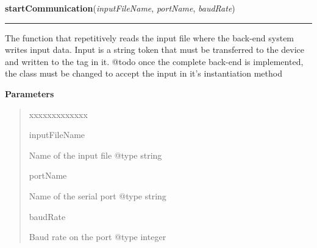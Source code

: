 \hspace{.8\funcindent}\begin{boxedminipage}{\funcwidth}

    \raggedright \textbf{startCommunication}(\textit{inputFileName}, \textit{portName}, \textit{baudRate})

    \vspace{-1.5ex}

    \rule{\textwidth}{0.5\fboxrule}
\setlength{\parskip}{2ex}
    The function that repetitively reads the input file where the back-end 
    system writes input data. Input is a string token that must be 
    transferred to the device and written to the tag in it. @todo once the 
    complete back-end is implemented, the class must be changed to accept 
    the input in it's instantiation method

\setlength{\parskip}{1ex}
      \textbf{Parameters}
      \vspace{-1ex}

      \begin{quote}
        \begin{Ventry}{xxxxxxxxxxxxx}

          \item[inputFileName]

          Name of the input file @type string

          \item[portName]

          Name of the serial port @type string

          \item[baudRate]

          Baud rate on the port @type integer

        \end{Ventry}

      \end{quote}

    \end{boxedminipage}


